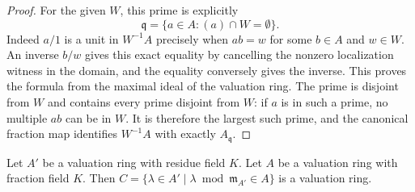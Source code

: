 \begin{proof}
For the given $W$, this
prime is explicitly
$$
\mathfrak q=\{a\in A:(a)\cap W=\emptyset\}.
$$
Indeed $a/1$ is a unit
in $W^{-1}A$ precisely when
$ab=w$ for some $b\in A$
and $w\in W$. An inverse
$b/w$ gives this exact
equality by cancelling the
nonzero localization witness
in the domain, and the
equality conversely gives
the inverse. This proves
the formula from the maximal
ideal of the valuation ring.
The prime is disjoint from
$W$ and contains every prime
disjoint from $W$: if
$a$ is in such a prime,
no multiple $ab$ can be
in $W$. It is therefore
the largest such prime,
and the canonical fraction
map identifies $W^{-1}A$
with exactly $A_{\mathfrak q}$.
\end{proof}

\begin{lemma}
\label{lemma-stack-valuation-rings}
Let $A'$ be a valuation ring with residue field $K$.
Let $A$ be a valuation ring with fraction field $K$.
Then
$C = \{\lambda \in A' \mid \lambda \bmod \mathfrak m_{A'} \in A\}$
is a valuation ring.
\end{lemma}


